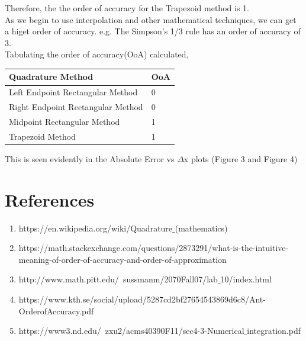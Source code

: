 \documentclass[11pt]{article}
\begin{document}
Therefore, the the order of accuracy for the Trapezoid method is 1.\\

As we begin to use interpolation and other mathematical techniques, we can get a higet order of accuracy. e.g. The Simpson's 1/3 rule has an order of accuracy of 3.\\

Tabulating the order of accuracy(OoA) calculated,\\
\begin{table} [h!]
	\centering
\begin{tabular}{| l || l |}
	\hline
	Quadrature Method & OoA  \\
	\hline \hline
	Left Endpoint Rectangular Method & 0\\
	\hline 
	Right Endpoint Rectangular Method & 0 \\
	\hline 
	Midpoint Rectangular Method & 1 \\
	\hline
	Trapezoid Method & 1 \\
	\hline
\end{tabular}
\end{table}

This is seen evidently in the Absolute Error vs $\Delta$x plots (Figure 3 and Figure 4)

\section{References}
\begin{enumerate}
	\item https://en.wikipedia.org/wiki/Quadrature$\_$(mathematics)
	\item https://math.stackexchange.com/questions/2873291/what-is-the-intuitive-meaning-of-order-of-accuracy-and-order-of-approximation
	\item http://www.math.pitt.edu/~sussmanm/2070Fall07/lab$\_$10/index.html
	\item https://www.kth.se/social/upload/5287cd2bf27654543869d6c8/Ant-OrderofAccuracy.pdf
	\item https://www3.nd.edu/~zxu2/acms40390F11/sec4-3-Numerical$\_$integration.pdf
\end{enumerate}
\end{document}
